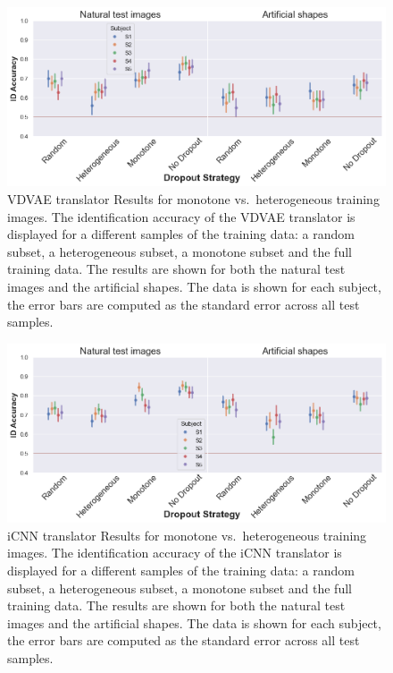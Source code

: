  \begin{figure}[H]
   \centering
   \includegraphics[width=1\textwidth]{plots/dropout_discussion_translator_id_acc_vdvae.png}
   \caption[VDVAE translator Results for monotone vs.\ heterogeneous training images]{VDVAE translator Results for monotone vs.\ heterogeneous training images. The identification accuracy of the VDVAE translator is displayed for a different samples of the training data: a random subset, a heterogeneous subset, a monotone subset and the full training data. The results are shown for both the natural test images and the artificial shapes. The data is shown for each subject, the error bars are computed as the standard error across all test samples.}\label{fig:dropout_discussion_translator_id_acc_vdvae}
 \end{figure}
 
 \begin{figure}[H]
   \centering
   \includegraphics[width=1\textwidth]{plots/dropout_discussion_translator_id_acc_icnn.png}
   \caption[iCNN translator Results for monotone vs.\ heterogeneous training images]{iCNN translator Results for monotone vs.\ heterogeneous training images. The identification accuracy of the iCNN translator is displayed for a different samples of the training data: a random subset, a heterogeneous subset, a monotone subset and the full training data. The results are shown for both the natural test images and the artificial shapes. The data is shown for each subject, the error bars are computed as the standard error across all test samples.}\label{fig:dropout_discussion_translator_id_acc_icnn}
 \end{figure}
 
